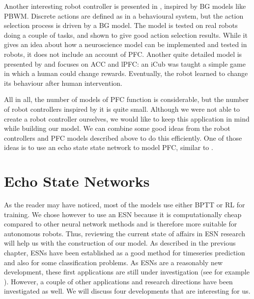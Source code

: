 \documentclass[10pt,a4paper]{report}
\begin{document}
Another interesting robot controller is presented in \citet{Prescott2006}, inspired by BG models like PBWM. Discrete actions are defined as in a behavioural system, but the action selection process is driven by a BG model. The model is tested on real robots doing a couple of tasks, and shown to give good action selection results. While it gives an idea about how a neuroscience model can be implemented and tested in robots, it does not include an account of PFC. Another quite detailed model is presented by \citet*{Khamassi2011} and focuses on ACC and lPFC: an iCub was taught a simple game in which a human could change rewards. Eventually, the robot learned to change its behaviour after human intervention. 

All in all, the number of models of PFC function is considerable, but the number of robot controllers inspired by it is quite small. Although we were not able to create a robot controller ourselves, we would like to keep this application in mind while building our model. We can combine some good ideas from the robot controllers and PFC models described above to do this efficiently. One of those ideas is to use an echo state state network to model PFC, similar to \citet{Dominey1995}. 

\section{Echo State Networks}
As the reader may have noticed, most of the models use either BPTT or RL for training. We chose however to use an ESN because it is computationally cheap compared to other neural network methods and is therefore more suitable for autonomous robots. Thus, reviewing the current state of affairs in ESN research will help us with the construction of our model. As described in the previous chapter, ESNs have been established as a good method for timeseries prediction and also for some classification problems. As ESNs are a reasonably new development, these first applications are still under investigation (see for example \citet{Zhang2012}). However, a couple of other applications and research directions have been investigated as well. We will discuss four developments that are interesting for us.
\end{document}
